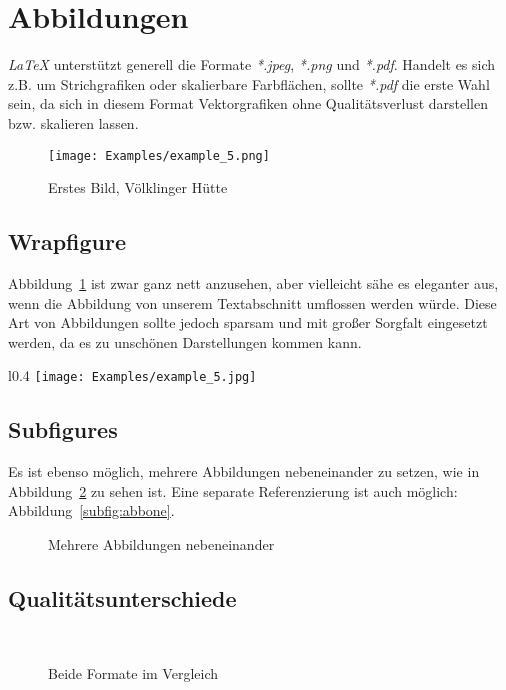 \section{Abbildungen}

\textit{LaTeX} unterstützt generell die Formate \textit{*.jpeg}, \textit{*.png} und \textit{*.pdf}.
Handelt es sich z.B. um Strichgrafiken oder skalierbare Farbflächen, sollte \textit{*.pdf} die erste Wahl sein,
da sich in diesem Format Vektorgrafiken ohne Qualitätsverlust darstellen bzw. skalieren lassen.

\begin{figure}[bth] 
  \centering
  \texttt{[image: Examples/example\_5.png]}
  \caption{Erstes Bild, Völklinger Hütte}
  \label{fig:Huette}
\end{figure}


\subsection{Wrapfigure}
Abbildung~\ref{fig:Huette} ist zwar ganz nett anzusehen, aber vielleicht sähe es eleganter aus, wenn die Abbildung 
von unserem Textabschnitt umflossen werden würde. Diese Art von Abbildungen sollte jedoch sparsam und mit großer Sorgfalt eingesetzt werden, da es zu unschönen Darstellungen kommen kann.
\blindtext
\begin{wrapfigure}{l}{0.4\textwidth}
  \centering
  \texttt{[image: Examples/example\_5.jpg]}
  \caption{Völklinger Hütte, *.jpg}
  \label{fig:Huette2}
\end{wrapfigure}
\blindtext


\subsection{Subfigures}
Es ist ebenso möglich, mehrere Abbildungen nebeneinander zu setzen, wie in Abbildung~\ref{fig:Beide} zu sehen ist. Eine separate Referenzierung ist auch möglich: Abbildung~\ref{subfig:abbone}.
\begin{figure}[bth]
  \hfill
  \caption{Mehrere Abbildungen nebeneinander}
  \label{fig:Beide}
\end{figure}


\subsection{Qualitätsunterschiede}
\begin{figure}[p]
	\centering
   \\
  \caption{Beide Formate im Vergleich}
  \label{fig:pdfvsjpg}
\end{figure}

